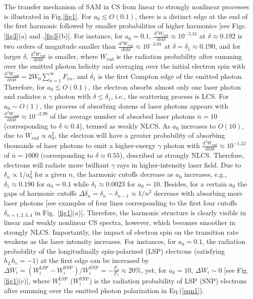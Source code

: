 \documentclass[10pt,twocolumn,showpacs,amsmath,amssymb,floatfix,superscriptaddress]{revtex4-2}
\begin{document}
The transfer mechanism of SAM in CS from linear to strongly nonlinear processes is illustrated in Fig.\ref{fig1}.  For $a_0 \lesssim O(0.1)$, there is a distinct edge at the end of the first harmonic followed by smaller probabilities of higher harmonics [see Figs.\ref{fig3}(a) and .\ref{fig3}(b)]. For instance, for $a_0=0.1$, $\frac{\mathrm{d}^2W_{rad}}{\mathrm{d}t\mathrm{d}\delta} \approx 10^{-5.31}$ at $\delta \approx 0.192$ is two orders of magnitude smaller than  $\frac{\mathrm{d}^2W_{rad}}{\mathrm{d}t\mathrm{d}\delta} \approx 10^{-3.01}$ at $\delta =\delta_1 \approx 0.190$, and for larger $\delta$, $\frac{\mathrm{d}^2W_{rad}}{\mathrm{d}t\mathrm{d}\delta}$ is smaller, where $W_{rad}$ is the radiation probability after summing over the emitted photon helicity and  averaging over the initial electron spin with $\frac{\mathrm{d}^2W_{rad}}{\mathrm{d}t\mathrm{d}\delta} = 2W_0 \sum_{n=1}^{\infty} F_{1n}$, and $\delta_1$ is the first Compton edge of the emitted photon. Therefore, for $a_0 \lesssim O(0.1)$, the electron absorbs almost only one laser photon and radiates a $\gamma$ photon with $\delta \leq \delta_1$, i.e., the scattering process is LCS. For $a_0 \sim O(1)$, the process of absorbing dozens of laser photons appears with $\frac{\mathrm{d}^2W_{rad}}{\mathrm{d}t\mathrm{d}\delta}\approx 10^{-2.99}$ of the average number of absorbed laser photons $\overline{n}=10$ (corresponding to $\delta \approx 0.4$), termed as weakly NLCS. As $a_0$ increases to $O(10)$, due to $W_{rad} \propto a_0^2$, the electron will have a greater probability of absorbing thousands of laser photons to emit a higher-energy $\gamma$ photon with $\frac{\mathrm{d}^2W_{rad}}{\mathrm{d}t\mathrm{d}\delta}\approx 10^{-1.22}$ of $\overline{n}=1000$ (corresponding to $\delta \approx 0.55$), described as strongly NLCS. Therefore, electrons will radiate more brilliant $\gamma$ rays in higher-intensity laser field. Due to $\delta_n \propto 1/a_0^2$ for a given $n$, the harmonic cutoffs decrease as $a_0$ increases, e.g., $\delta_1 \approx 0.190$ for $a_0=0.1$ while $\delta_1 \approx 0.0023$ for $a_0=10$. Besides, for a certain $a_0$ the gaps of harmonic cutoffs $\Delta \delta_n = \delta_n-\delta_{n-1} \propto 1/n^2$ decrease with absorbing more laser photons [see examples of four lines corresponding to the first four cutoffs $\delta_{n=1,2,3,4}$ in Fig.~\ref{fig1}(a)]. Therefore, the harmonic structure is clearly visible in linear and weakly nonlinear CS spectra, however, which becomes smoother in strongly NLCS. Importantly, the impact of electron spin on the transition rate weakens as the laser intensity increases. For instances, for $a_0=0.1$, the radiation probability of the longitudinally spin-polarized (LSP) electrons (satisfying $h_L h_e=-1$) at the first edge can be increased by $\Delta W_i=(W_i^{\mathrm{LSP}}-W_i^{\mathrm{SNP}})/W_i^{\mathrm{SNP}} = -\frac{F_2}{F_1} \approx 20\%$, yet, for $a_0=10$, $\Delta W_i \sim 0$ [see Fig.\ref{fig1}(c)], where $W_i^{\mathrm{LSP}}$ ($W_i^{\mathrm{SNP}}$) is the radiation probability of LSP (SNP) electrons after summing over the emitted photon polarization in Eq.(\ref{eqn1}).
\end{document}
